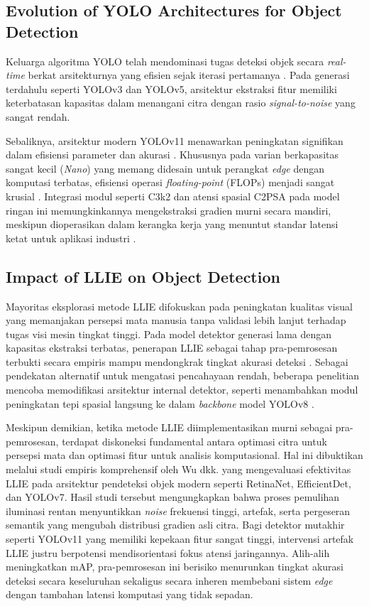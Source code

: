 \documentclass[conference]{IEEEtran}
\begin{document}
\subsection{Evolution of YOLO Architectures for Object Detection} 
Keluarga algoritma YOLO telah mendominasi tugas deteksi objek secara \textit{real-time} berkat arsitekturnya yang efisien sejak iterasi pertamanya \cite{redmon2016yolo,terven2023yoloreview}. Pada generasi terdahulu seperti YOLOv3 dan YOLOv5, arsitektur ekstraksi fitur memiliki keterbatasan kapasitas dalam menangani citra dengan rasio \textit{signal-to-noise} yang sangat rendah. 

Sebaliknya, arsitektur modern YOLOv11 menawarkan peningkatan signifikan dalam efisiensi parameter dan akurasi \cite{khanam2024yolov11}. Khususnya pada varian berkapasitas sangat kecil (\textit{Nano}) yang memang didesain untuk perangkat \textit{edge} dengan komputasi terbatas, efisiensi operasi \textit{floating-point} (FLOPs) menjadi sangat krusial \cite{akavaram2025flops,dobrzycki2025freezing}. Integrasi modul seperti C3k2 dan atensi spasial C2PSA pada model ringan ini memungkinkannya mengekstraksi gradien murni secara mandiri, meskipun dioperasikan dalam kerangka kerja yang menuntut standar latensi ketat untuk aplikasi industri \cite{liang2022edgeyolo}.

\subsection{Impact of LLIE on Object Detection} 
Mayoritas eksplorasi metode LLIE difokuskan pada peningkatan kualitas visual yang memanjakan persepsi mata manusia tanpa validasi lebih lanjut terhadap tugas visi mesin tingkat tinggi. Pada model detektor generasi lama dengan kapasitas ekstraksi terbatas, penerapan LLIE sebagai tahap pra-pemrosesan terbukti secara empiris mampu mendongkrak tingkat akurasi deteksi \cite{wang2023yolov5lowlight,shovo2024lowlight}. Sebagai pendekatan alternatif untuk mengatasi pencahayaan rendah, beberapa penelitian mencoba memodifikasi arsitektur internal detektor, seperti menambahkan modul peningkatan tepi spasial langsung ke dalam \textit{backbone} model YOLOv8 \cite{gong2025multiscale}.

Meskipun demikian, ketika metode LLIE diimplementasikan murni sebagai pra-pemrosesan, terdapat diskoneksi fundamental antara optimasi citra untuk persepsi mata dan optimasi fitur untuk analisis komputasional. Hal ini dibuktikan melalui studi empiris komprehensif oleh Wu dkk. \cite{wu2024llieeffect} yang mengevaluasi efektivitas LLIE pada arsitektur pendeteksi objek modern seperti RetinaNet, EfficientDet, dan YOLOv7. Hasil studi tersebut mengungkapkan bahwa proses pemulihan iluminasi rentan menyuntikkan \textit{noise} frekuensi tinggi, artefak, serta pergeseran semantik yang mengubah distribusi gradien asli citra. Bagi detektor mutakhir seperti YOLOv11 yang memiliki kepekaan fitur sangat tinggi, intervensi artefak LLIE justru berpotensi mendisorientasi fokus atensi jaringannya. Alih-alih meningkatkan mAP, pra-pemrosesan ini berisiko menurunkan tingkat akurasi deteksi secara keseluruhan sekaligus secara inheren membebani sistem \textit{edge} dengan tambahan latensi komputasi yang tidak sepadan.
\end{document}
